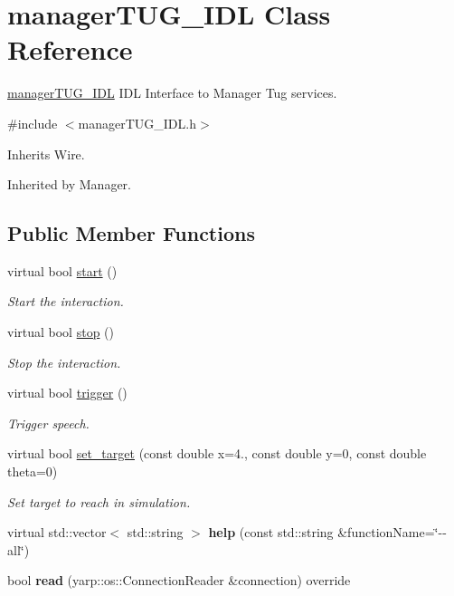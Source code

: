 \section{manager\+T\+U\+G\+\_\+\+I\+DL Class Reference}
\label{classmanagerTUG__IDL}


\hyperlink{classmanagerTUG__IDL}{manager\+T\+U\+G\+\_\+\+I\+DL} I\+DL Interface to Manager Tug services.  




{\ttfamily \#include $<$manager\+T\+U\+G\+\_\+\+I\+D\+L.\+h$>$}



Inherits Wire.



Inherited by Manager.

\subsection*{Public Member Functions}
\begin{DoxyCompactItemize}
\item 
virtual bool \hyperlink{classmanagerTUG__IDL_accbf9248b8f8f7688dba51a324624c0c}{start} ()
\begin{DoxyCompactList}\small\item\em Start the interaction. \end{DoxyCompactList}\item 
virtual bool \hyperlink{classmanagerTUG__IDL_a4e4054e0f008e1207c08df67eb92a6ac}{stop} ()
\begin{DoxyCompactList}\small\item\em Stop the interaction. \end{DoxyCompactList}\item 
virtual bool \hyperlink{classmanagerTUG__IDL_a0df471a196495dee8c7c8fbc19bd3827}{trigger} ()
\begin{DoxyCompactList}\small\item\em Trigger speech. \end{DoxyCompactList}\item 
virtual bool \hyperlink{classmanagerTUG__IDL_a323b64c2ea99a5b4ab2db84a98b630c7}{set\+\_\+target} (const double x=4., const double y=0, const double theta=0)
\begin{DoxyCompactList}\small\item\em Set target to reach in simulation. \end{DoxyCompactList}\item 
\mbox{\label{classmanagerTUG__IDL_ad4b8169fc41c778f6bb4d0ac75a8a455}} 
virtual std\+::vector$<$ std\+::string $>$ {\bfseries help} (const std\+::string \&function\+Name=\char`\"{}-\/-\/all\char`\"{})
\item 
\mbox{\label{classmanagerTUG__IDL_aebc7f06915a0979d419c2d6b68281fa5}} 
bool {\bfseries read} (yarp\+::os\+::\+Connection\+Reader \&connection) override
\end{DoxyCompactItemize}


